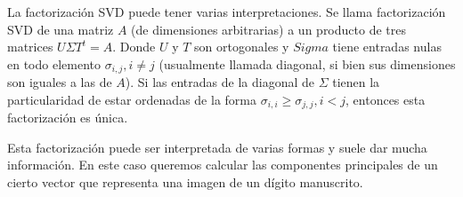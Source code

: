 \PARstart La factorizaci\'on SVD puede tener varias interpretaciones.
Se llama factorizaci\'on SVD de una matriz $A$ (de dimensiones arbitrarias)
a un producto de tres matrices $U\Sigma T^{t} = A$. Donde $U$ y $T$
son ortogonales y $Sigma$ tiene entradas nulas en todo elemento
$\sigma_{i,j}, i\neq j$ (usualmente llamada diagonal, si bien sus dimensiones
son iguales a las de $A$). Si las entradas de la diagonal de $\Sigma$ tienen
la particularidad de estar ordenadas de la forma $\sigma_{i,i} \geq
\sigma_{j,j}, i<j$, entonces esta factorizaci\'on es \'unica.

Esta factorizaci\'on puede ser interpretada de varias formas y suele
dar mucha informaci\'on. En este caso queremos calcular las componentes
principales de un cierto vector que representa una imagen de un d\'igito
manuscrito.
